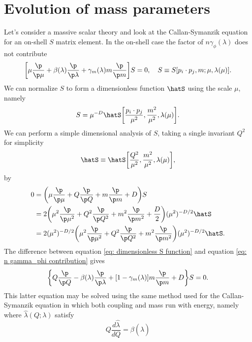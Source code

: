 \section{Evolution of mass parameters}
Let's consider a massive scalar theory and look at the Callan-Symanzik equation for an on-shell $S$ matrix element. In the on-shell case the factor of $n\gamma_\phi(\lambda)$ does not contribute
\begin{equation}
\label{eq: n gamma_phi contribution}
    \bigg[\mu\frac{\p}{\p \mu} + \beta(\lambda)\frac{\p}{\p \lambda} + \gamma_m(\lambda)m\frac{\p}{\p m }\bigg]S = 0,\quad S \equiv S[p_i\cdot p_j,m;\mu,\lambda(\mu)].
\end{equation}
We can normalize $S$ to form a dimensionless function $\hatS$ using the scale $\mu$, namely 
\begin{equation}
    S = \mu^{-D}\hatS\bigg[\frac{p_i\cdot p_j}{\mu^2},\frac{m^2}{\mu^2},\lambda(\mu)\bigg].
\end{equation}
We can perform a simple dimensional analysis of $S$, taking a single invariant $Q^2$ for simplicity
\begin{equation}
    \hatS \equiv \hatS\bigg[\frac{Q^2}{\mu^2},\frac{m^2}{\mu^2},\lambda(\mu)\bigg],
\end{equation}
by
\begin{equation}
\label{eq: dimensionless S function}
    \begin{split}
        0 &= \bigg(\mu\frac{\p}{\p \mu} + Q\frac{\p}{\p Q} + m\frac{\p}{\p m} + D\bigg)S \\
        &= 2\bigg(\mu^2\frac{\p}{\p \mu^2} + Q^2\frac{\p}{\p Q^2} + m^2\frac{\p}{\p m^2} + \frac{D}{2}\bigg)(\mu^2)^{-D/2}\hatS \\
        &= 2(\mu^2)^{-D/2}\bigg(\mu^2\frac{\p}{\p \mu^2} + Q^2\frac{\p}{\p Q^2} + m^2\frac{\p}{\p m^2} \bigg)(\mu^2)^{-D/2}\hatS.
    \end{split}
\end{equation}
The difference between equation \eqref{eq: dimensionless S function} and equation \eqref{eq: n gamma_phi contribution} gives
\begin{equation}
    \bigg\{Q\frac{\p}{\p Q} - \beta(\lambda)\frac{\p}{\p\lambda} + [1 - \gamma_m(\lambda)]m\frac{\p}{\p m} + D\bigg\}S = 0.
\end{equation}
This latter equation may be solved using the same method used for the Callan-Symanzik equation in which both coupling and mass run with energy, namely where $\hat{\lambda}(Q;\lambda)$ satisfy 
\begin{equation}
    Q\frac{d\hat{\lambda}}{dQ} = \beta(\hat{\lambda})
\end{equation}
